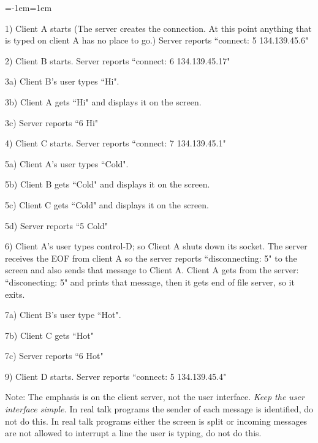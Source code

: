 \medskip

{\parskip=0pt\parindent=-1em\leftskip=1em

1) Client A starts (The server creates the connection. At this point anything
that is typed on client A has no place to go.)
Server reports ``connect: 5 134.139.45.6"

2) Client B starts.
Server reports ``connect: 6 134.139.45.17"

3a) Client B's user types ``Hi".

3b) Client A gets ``Hi" and displays it on the screen.

3c) Server reports ``6 Hi"

4) Client C starts.
Server reports ``connect: 7 134.139.45.1"

5a) Client A's user types ``Cold".

5b) Client B gets ``Cold" and displays it on the screen.

5c) Client C gets ``Cold" and displays it on the screen.

5d) Server reports ``5 Cold"

6) Client A's user types control-D; so Client A shuts down its socket.
The server receives the EOF from client A so the server 
reports ``disconnecting: 5" to the screen and also sends 
that message to Client A.
Client A gets from the server: ``disconecting: 5" and prints that message,
then it gets end of file server, so it exits.

7a) Client B's user type ``Hot".

7b) Client C gets ``Hot"

7c) Server reports ``6 Hot"

9) Client D starts.
Server reports ``connect: 5 134.139.45.4"

}
\par

Note: The emphasis is on the client server, not the user interface.
{\it Keep the user interface simple.}
In real talk programs the sender of each message is identified, do not do this.
In real talk programs either the screen is split or incoming messages are
not allowed to interrupt a line the user is typing, do not do this.
\bye
